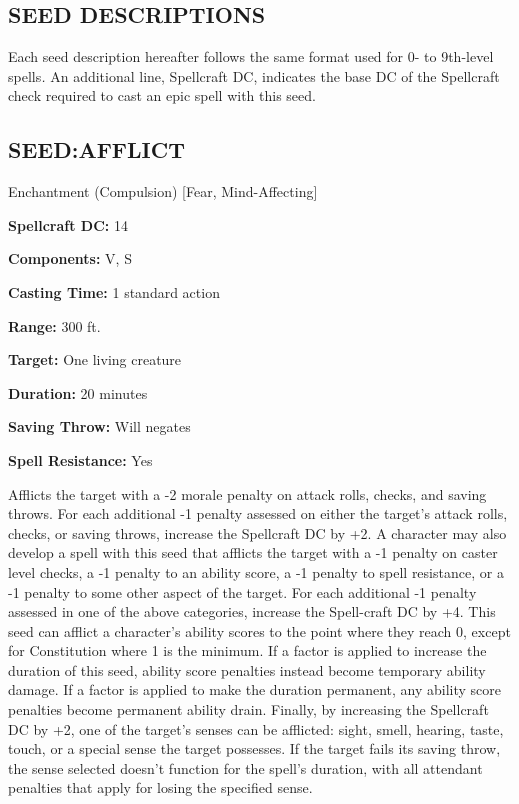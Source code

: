 \documentclass{article}
\begin{document}
\vspace{24pt}
\subsection*{{\LARGE{}SEED DESCRIPTIONS }}

Each seed description hereafter follows the same format used for 0- to 9th-level 
spells\textit{. }An additional line, Spellcraft DC, indicates the base DC of the 
Spellcraft check required to cast an epic spell with this seed. 

\vspace{12pt}
\subsection*{SEED:AFFLICT }

Enchantment (Compulsion) [Fear, Mind-Affecting] 

\textbf{Spellcraft DC:} 14 

\textbf{Components:} V, S 

\textbf{Casting Time:} 1 standard action 

\textbf{Range:} 300 ft. 

\textbf{Target:} One living creature 

\textbf{Duration:} 20 minutes 

\textbf{Saving Throw:} Will negates 

\textbf{Spell Resistance:} Yes 

Afflicts the target with a -2 morale penalty on attack rolls, checks, and saving 
throws. For each additional -1 penalty assessed on either the target's attack rolls, 
checks, or saving throws, increase the Spellcraft DC by +2. A character may also 
develop a spell with this seed that afflicts the target with a -1 penalty on caster 
level checks, a -1 penalty to an ability score, a -1 penalty to spell resistance, 
or a -1 penalty to some other aspect of the target. For each additional -1 penalty 
assessed in one of the above categories, increase the Spell-craft DC by +4. This 
seed can afflict a character's ability scores to the point where they reach 0, 
except for Constitution where 1 is the minimum. If a factor is applied to increase 
the duration of this seed, ability score penalties instead become temporary ability 
damage. If a factor is applied to make the duration permanent, any ability score 
penalties become permanent ability drain. Finally, by increasing the Spellcraft 
DC by +2, one of the target's senses can be afflicted: sight, smell, hearing, taste, 
touch, or a special sense the target possesses. If the target fails its saving 
throw, the sense selected doesn't function for the spell's duration, with all attendant 
penalties that apply for losing the specified sense. 
\end{document}
